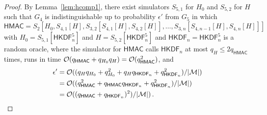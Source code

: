 \documentclass[compsoc, conference, letterpaper, 10pt, times]{IEEEtran}
\newcommand{\HKDF}{\mathsf{HKDF}}
\newcommand{\hmac}{\mathsf{HMAC}}
\newcommand{\Smac}{\mathcal{M}}
\newcommand{\ab}{\allowbreak}
\begin{document}
\begin{proof}
By Lemma~\ref{lem:hcomp1}, there exist simulators $S_{5,1}$ for $H_0$
and $S_{5,2}$ for $H$ such that
$G_4$ is indistinguishable up to probability $\epsilon'$
from $G_5$ in which
$\hmac = S_2[H_0, \ab S_{4,1}[H], \ab S_{3,2}[S_{4,1}[H], S_{4,2}[H]], \ab \dots, \ab S_{3,n}[S_{4,n-1}[H], S_{4,n}[H]]]$ with $H_0 = S_{5,1}[\HKDF^5_n]$ and $H = S_{5,2}[\HKDF^5_n]$
and $\HKDF_n = \HKDF^5_n$  is a random oracle, where
the simulator for $\hmac$ calls $\HKDF_n$ at most $q_H \leq 2 q_{\hmac}$ times,
runs in time ${\cal O}(q_{\hmac} + q_{H_0} q_H) = {\cal O}(q_{\hmac}^2)$,
and 
\begin{align*}
\epsilon' &= {\cal O}((q_H q_{H_0} + q_{H_0}^2 + q_H q_{\HKDF_n} + q_{\HKDF_n}^2)/|\Smac|)\\
& = {\cal O}((q_{\hmac}^2 + q_{\hmac}q_{\HKDF_n} + q_{\HKDF_n}^2)/|\Smac|) \\
&= {\cal O}((q_{\hmac} + q_{\HKDF_n})^2)/|\Smac|)\,.
\end{align*}


\end{proof}
\end{document}
